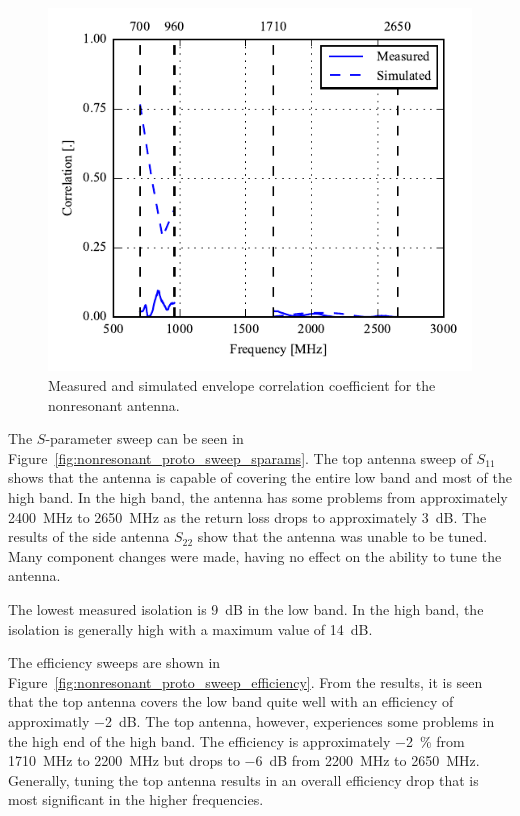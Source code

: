 \begin{figure}[htbp]
    \centering
    \includegraphics{img/tech_sol/nonresonant/prototype/correlation.pdf}
    \caption{Measured and simulated envelope correlation coefficient for the nonresonant antenna.}
    \label{fig:nonresonant_proto_ecc}
\end{figure}

\FloatBarrier
The $S$-parameter sweep can be seen in Figure~\ref{fig:nonresonant_proto_sweep_sparams}. The top antenna sweep of $S_{11}$ shows that the antenna is capable of covering the entire low band and most of the high band. In the high band, the antenna has some problems from approximately \SI{2400}{MHz} to \SI{2650}{MHz} as the return loss drops to approximately \SI{3}{dB}. The results of the side antenna $S_{22}$ show that the antenna was unable to be tuned. Many component changes were made, having no effect on the ability to tune the antenna. 

The lowest measured isolation is \SI{9}{dB} in the low band. In the high band, the isolation is generally high with a maximum value of \SI{14}{dB}. 

The efficiency sweeps are shown in Figure~\ref{fig:nonresonant_proto_sweep_efficiency}. From the results, it is seen that the top antenna covers the low band quite well with an efficiency of approximatly \SI{-2}{dB}. The top antenna, however, experiences some problems in the high end of the high band. The efficiency is approximately \SI{-2}{\percent} from \SI{1710}{MHz} to \SI{2200}{MHz} but drops to \SI{-6}{dB} from \SI{2200}{MHz} to \SI{2650}{MHz}. Generally, tuning the top antenna results in an overall efficiency drop that is most significant in the higher frequencies.

